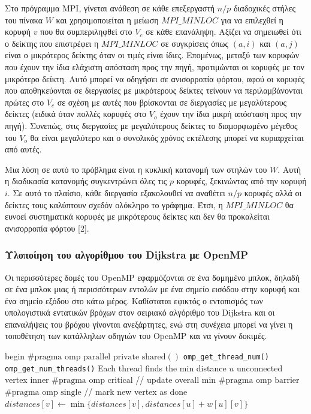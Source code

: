 \documentclass[12pt,a4paper]{article} %
\begin{document}
{Στο πρόγραμμα MPI, γίνεται ανάθεση σε κάθε επεξεργαστή $n/p$ διαδοχικές στήλες του πίνακα $W$ και χρησιμοποιείται η μείωση \texttt{$MPI\_MINLOC$} για να επιλεχθεί η κορυφή $v$ που θα συμπεριληφθεί στο $V_c$ σε κάθε επανάληψη. Αξίζει να σημειωθεί ότι ο δείκτης που επιστρέφει η \texttt{$MPI\_MINLOC$} σε συγκρίσεις όπως $(a,i)$ και $(a,j)$ είναι ο μικρότερος δείκτης όταν οι τιμές είναι ίδιες. Επομένως, μεταξύ των κορυφών που έχουν την ίδια ελάχιστη απόσταση προς την πηγή, προτιμώνται οι κορυφές με τον μικρότερο δείκτη. Αυτό μπορεί να οδηγήσει σε ανισορροπία φόρτου, αφού οι κορυφές που αποθηκεύονται σε διεργασίες με μικρότερους δείκτες τείνουν να περιλαμβάνονται πρώτες στο $V_c$ σε σχέση με αυτές που βρίσκονται σε διεργασίες με μεγαλύτερους δείκτες (ειδικά όταν πολλές κορυφές στο $V_o$ έχουν την ίδια μικρή απόσταση προς την πηγή). Συνεπώς, στις διεργασίες με μεγαλύτερους δείκτες το διαμορφωμένο μέγεθος του $V_o$ θα είναι μεγαλύτερο και ο συνολικός χρόνος εκτέλεσης μπορεί να κυριαρχείται από αυτές.

Μια λύση σε αυτό το πρόβλημα είναι η κυκλική κατανομή των στηλών του $W$. Αυτή η διαδικασία κατανομής συγκεντρώνει όλες τις $p$ κορυφές, ξεκινώντας από την κορυφή $i$. Σε αυτό το πλαίσιο, κάθε διεργασία εξακολουθεί να αναθέτει $n/p$ κορυφές αλλά οι δείκτες τους καλύπτουν σχεδόν ολόκληρο το γράφημα. Έτσι, η \texttt{$MPI\_MINLOC$} θα ευνοεί συστηματικά κορυφές με μικρότερους δείκτες και δεν θα προκαλείται ανισορροπία φόρτου [2].

\subsubsection{Υλοποίηση του αλγορίθμου του Dijkstra με OpenMP}

Οι περισσότερες δομές του OpenMP εφαρμόζονται σε ένα δομημένο μπλοκ, δηλαδή σε ένα μπλοκ μιας ή περισσότερων εντολών με ένα σημείο εισόδου στην κορυφή και ένα σημείο εξόδου στο κάτω μέρος. Καθίσταται εφικτός ο εντοπισμός των υπολογιστικά εντατικών βρόχων στον σειριακό αλγόριθμο του Dijkstra και οι επαναλήψεις του βρόχου γίνονται ανεξάρτητες, ενώ στη συνέχεια μπορεί να γίνει η τοποθέτηση των κατάλληλων οδηγιών του OpenMP και να γίνουν δοκιμές.

\begin{algorithm}[H]
\begin{algorithmic}[1]
    \State begin
        \State $\#\text{pragma omp parallel private}$
        \State $\text{shared}()$
        \State \texttt{omp\_get\_thread\_num()}
        \State \texttt{omp\_get\_num\_threads()}
        \State Each thread finds the min distance $u$ unconnected vertex inner
        \State $\#\text{pragma omp critical}$ \quad // update overall min
        \State $\#\text{pragma omp barrier}$
        \State $\#\text{pragma omp single}$ \quad // mark new vertex as done
            \State $distances[v] \gets \min\{distances[v], distances[u] + w[u][v]\}$
        \EndFor
    \EndWhile
\EndProcedure
\end{algorithmic}
\end{algorithm}

}
\end{document}
